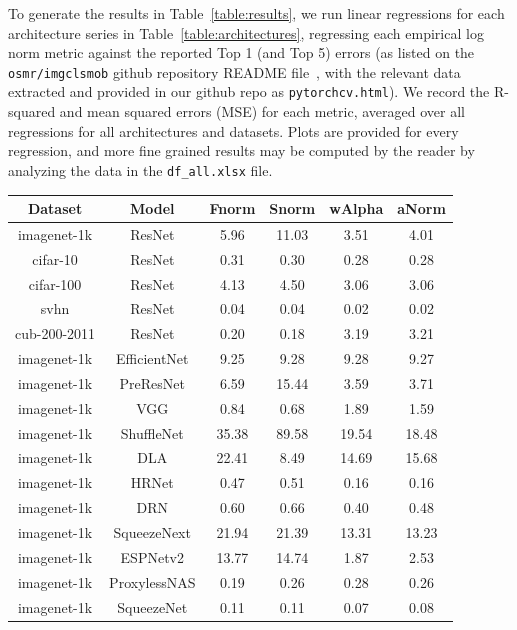 To generate the results in Table~\ref{table:results}, we run linear regressions for each architecture series in Table~\ref{table:architectures}, regressing each empirical log norm metric against the reported Top 1 (and Top 5) errors (as listed on the \texttt{osmr/imgclsmob} github repository README file~\cite{osmr}, with the relevant data extracted and provided in our github repo as \texttt{pytorchcv.html}).
We record the R-squared and mean squared errors (MSE) for each metric, averaged over all regressions for all architectures and datasets.
Plots are provided for every regression, and more fine grained results may be computed by the reader by analyzing the data in the \texttt{df\_all.xlsx} file.

 

\begin{table}[t]
\small
\begin{center}
\begin{tabular}{|c|c|c|c|c|c|}
Dataset & Model & Fnorm & Snorm & wAlpha & aNorm \\
\hline
 imagenet-1k & ResNet  & 5.96 &  11.03 & 3.51 & 4.01 \\
 cifar-10 & ResNet  & 0.31 &  0.30 & 0.28 & 0.28 \\
 cifar-100 & ResNet  & 4.13 &  4.50 & 3.06 & 3.06 \\
 svhn & ResNet  & 0.04 &  0.04 & 0.02 & 0.02 \\
 cub-200-2011 & ResNet  & 0.20 &  0.18 & 3.19 & 3.21 \\
 imagenet-1k & EfficientNet  & 9.25 &  9.28 & 9.28 & 9.27 \\
 imagenet-1k & PreResNet  & 6.59 &  15.44 & 3.59 & 3.71 \\
 imagenet-1k & VGG  & 0.84 &  0.68 & 1.89 & 1.59 \\
 imagenet-1k & ShuffleNet  & 35.38 &  89.58 & 19.54 & 18.48 \\
 imagenet-1k & DLA  & 22.41 &  8.49 & 14.69 & 15.68 \\
 imagenet-1k & HRNet  & 0.47 &  0.51 & 0.16 & 0.16 \\
 imagenet-1k & DRN  & 0.60 &  0.66 & 0.40 & 0.48 \\
 imagenet-1k & SqueezeNext  & 21.94 &  21.39 & 13.31 & 13.23 \\
 imagenet-1k & ESPNetv2  & 13.77 &  14.74 & 1.87 & 2.53 \\
 imagenet-1k & ProxylessNAS  & 0.19 &  0.26 & 0.28 & 0.26 \\
 imagenet-1k & SqueezeNet  & 0.11 &  0.11 & 0.07 & 0.08 \\

\end{tabular}
\end{center}
\end{table}
